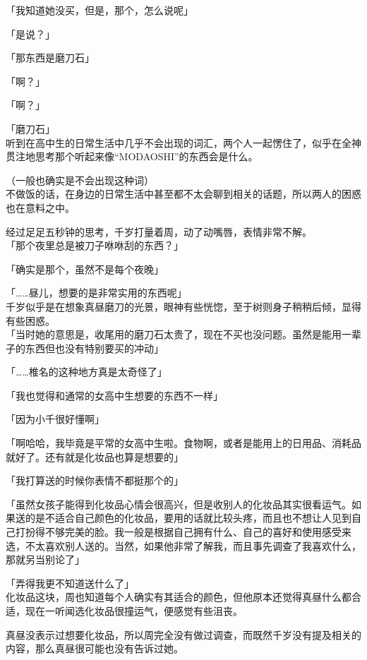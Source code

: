 「我知道她没买，但是，那个，怎么说呢」

「是说？」

「那东西是磨刀石」

「啊？」

「啊？」

「磨刀石」\\

听到在高中生的日常生活中几乎不会出现的词汇，两个人一起愣住了，似乎在全神贯注地思考那个听起来像“MODAOSHI”的东西会是什么。

（一般也确实是不会出现这种词）\\

不做饭的话，在身边的日常生活中甚至都不太会聊到相关的话题，所以两人的困惑也在意料之中。

经过足足五秒钟的思考，千岁打量着周，动了动嘴唇，表情非常不解。\\

「那个夜里总是被刀子咻咻刮的东西？」

「确实是那个，虽然不是每个夜晚」

「……昼儿，想要的是非常实用的东西呢」\\

千岁似乎是在想象真昼磨刀的光景，眼神有些恍惚，至于树则身子稍稍后倾，显得有些困惑。\\

「当时她的意思是，收尾用的磨刀石太贵了，现在不买也没问题。虽然是能用一辈子的东西但也没有特别要买的冲动」

「……椎名的这种地方真是太奇怪了」

「我也觉得和通常的女高中生想要的东西不一样」

「因为小千很好懂啊」

「啊哈哈，我毕竟是平常的女高中生啦。食物啊，或者是能用上的日用品、消耗品就好了。还有就是化妆品也算是想要的」

「我打算送的时候你表情不都挺那个的」

「虽然女孩子能得到化妆品心情会很高兴，但是收别人的化妆品其实很看运气。如果送的是不适合自己颜色的化妆品，要用的话就比较头疼，而且也不想让人见到自己打扮得不够完美的脸。我一般是根据自己拥有什么、自己的喜好和使用感受来选，不太喜欢别人送的。当然，如果他非常了解我，而且事先调查了我喜欢什么，那就另当别论了」

「弄得我更不知道送什么了」\\

化妆品这块，周也知道每个人确实有其适合的颜色，但他原本还觉得真昼什么都合适，现在一听闻选化妆品很撞运气，便感觉有些沮丧。

真昼没表示过想要化妆品，所以周完全没有做过调查，而既然千岁没有提及相关的内容，那么真昼很可能也没有告诉过她。\\

